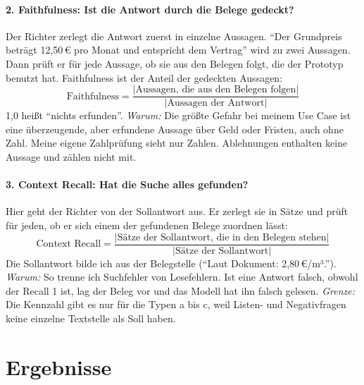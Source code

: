 \paragraph{2. Faithfulness: Ist die Antwort durch die Belege gedeckt?} Der Richter zerlegt die Antwort zuerst in einzelne Aussagen. \enquote{Der Grundpreis beträgt 12,50\,€ pro Monat und entspricht dem Vertrag} wird zu zwei Aussagen. Dann prüft er für jede Aussage, ob sie aus den Belegen folgt, die der Prototyp benutzt hat. Faithfulness ist der Anteil der gedeckten Aussagen:
\[
\text{Faithfulness} = \frac{|\text{Aussagen, die aus den Belegen folgen}|}{|\text{Aussagen der Antwort}|}
\]
1,0 heißt \enquote{nichts erfunden}. \emph{Warum:} Die größte Gefahr bei meinem Use Case ist eine überzeugende, aber erfundene Aussage über Geld oder Fristen, auch ohne Zahl. Meine eigene Zahlprüfung sieht nur Zahlen. Ablehnungen enthalten keine Aussage und zählen nicht mit.

\paragraph{3. Context Recall: Hat die Suche alles gefunden?} Hier geht der Richter von der Sollantwort aus. Er zerlegt sie in Sätze und prüft für jeden, ob er sich einem der gefundenen Belege zuordnen lässt:
\[
\text{Context Recall} = \frac{|\text{Sätze der Sollantwort, die in den Belegen stehen}|}{|\text{Sätze der Sollantwort}|}
\]
Die Sollantwort bilde ich aus der Belegstelle (\enquote{Laut Dokument: 2,80\,€/m³.}). \emph{Warum:} So trenne ich Suchfehler von Lesefehlern. Ist eine Antwort falsch, obwohl der Recall 1 ist, lag der Beleg vor und das Modell hat ihn falsch gelesen. \emph{Grenze:} Die Kennzahl gibt es nur für die Typen a bis c, weil Listen- und Negativfragen keine einzelne Textstelle als Soll haben.

\section{Ergebnisse}
\label{sec:ergebnisse}

